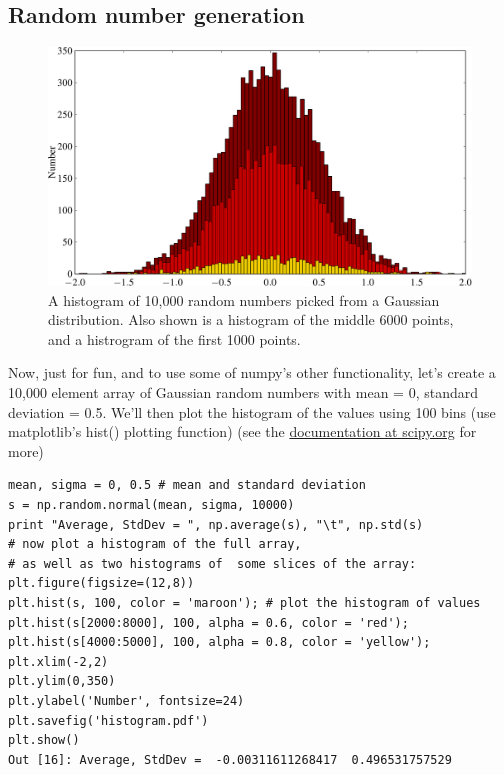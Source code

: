 \subsection{Random number generation}
\begin{figure}[h]
	\centering
	\includegraphics[width=12cm]{Figures/BasicPython/histo.pdf}
	\caption{A histogram of 10,000 random numbers picked from a Gaussian distribution. Also shown is a histogram of the middle 6000 points, and a histrogram of the first 1000 points.}
	\label{fig:histogram}       %
\end{figure}
Now, just for fun, and to use some of numpy's other functionality,  let's create a 10,000 element array of Gaussian random numbers with mean = 0, standard deviation = 0.5. We'll then plot the histogram of the values using 100 bins (use matplotlib's hist() plotting function) 
(see the \href{http://docs.scipy.org/doc/numpy/reference/routines.random.html}{documentation at scipy.org} for more)

\begin{lstlisting}
mean, sigma = 0, 0.5 # mean and standard deviation
s = np.random.normal(mean, sigma, 10000)
print "Average, StdDev = ", np.average(s), "\t", np.std(s)
# now plot a histogram of the full array, 
# as well as two histograms of  some slices of the array:
plt.figure(figsize=(12,8))
plt.hist(s, 100, color = 'maroon'); # plot the histogram of values
plt.hist(s[2000:8000], 100, alpha = 0.6, color = 'red');
plt.hist(s[4000:5000], 100, alpha = 0.8, color = 'yellow');
plt.xlim(-2,2)
plt.ylim(0,350)
plt.ylabel('Number', fontsize=24)
plt.savefig('histogram.pdf')
plt.show()
Out [16]: Average, StdDev =  -0.00311611268417 	0.496531757529
\end{lstlisting}



